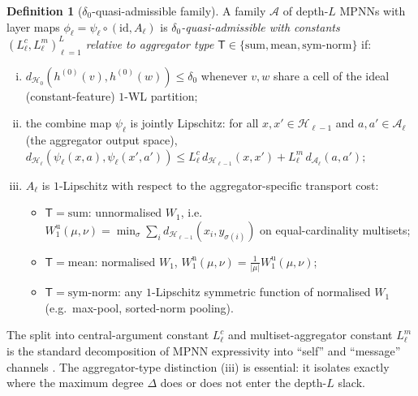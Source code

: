 \documentclass[10pt]{article}
\theoremstyle{definition}
\newtheorem{definition}[theorem]{Definition}
\theoremstyle{remark}
\begin{document}
\begin{definition}[$\delta_{0}$-quasi-admissible family]\label{def:quasi-admissible}
A family $\mathcal{A}$ of depth-$L$ MPNNs with layer maps
$\phi_{\ell} = \psi_{\ell} \circ (\mathrm{id}, A_{\ell})$ is
\emph{$\delta_{0}$-quasi-admissible with constants
$(L_{\ell}^{c}, L_{\ell}^{m})_{\ell=1}^{L}$ relative to
aggregator type $\mathsf{T} \in \{\mathrm{sum}, \mathrm{mean},
\mathrm{sym\text{-}norm}\}$} if:
\begin{enumerate}[(i)]
  \item $d_{\mathcal{H}_{0}}(h^{(0)}(v), h^{(0)}(w)) \le \delta_{0}$
    whenever $v, w$ share a cell of the ideal (constant-feature)
    $1$-WL partition;
  \item the combine map $\psi_{\ell}$ is jointly Lipschitz: for
    all $x, x' \in \mathcal{H}_{\ell-1}$ and $a, a' \in \mathcal{A}_{\ell}$
    (the aggregator output space),
    \(
      d_{\mathcal{H}_{\ell}}(\psi_{\ell}(x, a), \psi_{\ell}(x', a'))
      \le L_{\ell}^{c}\, d_{\mathcal{H}_{\ell-1}}(x, x')
        + L_{\ell}^{m}\, d_{\mathcal{A}_{\ell}}(a, a');
    \)
  \item $A_{\ell}$ is $1$-Lipschitz with respect to the
    aggregator-specific transport cost:
    \begin{itemize}
      \item $\mathsf{T} = \mathrm{sum}$: unnormalised $W_{1}$,
        i.e.\ $W_{1}^{\mathrm{u}}(\mu, \nu) =
          \min_{\sigma} \sum_{i} d_{\mathcal{H}_{\ell-1}}
            (x_{i}, y_{\sigma(i)})$ on equal-cardinality
        multisets;
      \item $\mathsf{T} = \mathrm{mean}$: normalised $W_{1}$,
        $W_{1}^{\mathrm{n}}(\mu, \nu) = \tfrac{1}{|\mu|}
          W_{1}^{\mathrm{u}}(\mu, \nu)$;
      \item $\mathsf{T} = \mathrm{sym\text{-}norm}$: any
        $1$-Lipschitz symmetric function of normalised $W_{1}$
        (e.g.\ max-pool, sorted-norm pooling).
    \end{itemize}
\end{enumerate}
\end{definition}

The split into central-argument constant $L_{\ell}^{c}$ and
multiset-aggregator constant $L_{\ell}^{m}$ is the standard
decomposition of MPNN expressivity into ``self'' and ``message''
channels \citep{xu2019gin, corso2020pna}. The aggregator-type
distinction (iii) is essential: it isolates exactly where the
maximum degree $\Delta$ does or does not enter the depth-$L$
slack.
\end{document}
